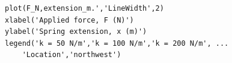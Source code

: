 \documentclass[border=12pt]{standalone}
\begin{document}
\begin{lstlisting}[style=matlab]
plot(F_N,extension_m.','LineWidth',2)
xlabel('Applied force, F (N)')
ylabel('Spring extension, x (m)')
legend('k = 50 N/m','k = 100 N/m','k = 200 N/m', ...
    'Location','northwest')
\end{lstlisting}
\end{document}
